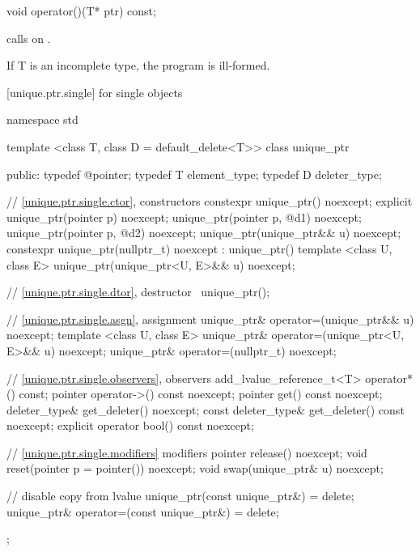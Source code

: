 \begin{itemdecl}
void operator()(T* ptr) const;
\end{itemdecl}

\begin{itemdescr}
\pnum
\effects
calls  on .

\pnum
\notes If T is an incomplete type, the program is ill-formed.
\end{itemdescr}

[unique.ptr.single]{ for single objects}

\begin{codeblock}
namespace std {
  template <class T, class D = default_delete<T>> class unique_ptr {
  public:
    typedef @\seebelow@ pointer;
    typedef T element_type;
    typedef D deleter_type;

    // \ref{unique.ptr.single.ctor}, constructors
    constexpr unique_ptr() noexcept;
    explicit unique_ptr(pointer p) noexcept;
    unique_ptr(pointer p, @\seebelow@ d1) noexcept;
    unique_ptr(pointer p, @\seebelow@ d2) noexcept;
    unique_ptr(unique_ptr&& u) noexcept;
    constexpr unique_ptr(nullptr_t) noexcept
      : unique_ptr() { }
    template <class U, class E>
      unique_ptr(unique_ptr<U, E>&& u) noexcept;

    // \ref{unique.ptr.single.dtor}, destructor
    ~unique_ptr();

    // \ref{unique.ptr.single.asgn}, assignment
    unique_ptr& operator=(unique_ptr&& u) noexcept;
    template <class U, class E> unique_ptr& operator=(unique_ptr<U, E>&& u) noexcept;
    unique_ptr& operator=(nullptr_t) noexcept;

    // \ref{unique.ptr.single.observers}, observers
    add_lvalue_reference_t<T> operator*() const;
    pointer operator->() const noexcept;
    pointer get() const noexcept;
    deleter_type& get_deleter() noexcept;
    const deleter_type& get_deleter() const noexcept;
    explicit operator bool() const noexcept;

    // \ref{unique.ptr.single.modifiers} modifiers
    pointer release() noexcept;
    void reset(pointer p = pointer()) noexcept;
    void swap(unique_ptr& u) noexcept;

    // disable copy from lvalue
    unique_ptr(const unique_ptr&) = delete;
    unique_ptr& operator=(const unique_ptr&) = delete;
  };
}
\end{codeblock}

